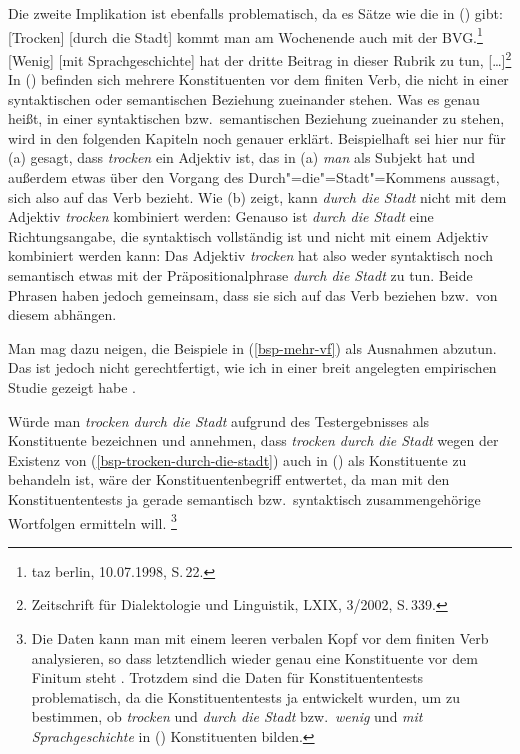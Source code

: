\documentclass[ number=45
			   ,series=eotms
			   ,printondemand
			  ]{langsci}
\newcommand{\NOTE}[1]{}
\begin{document}
{Die zweite Implikation ist ebenfalls problematisch, da es Sätze
wie die in () gibt:
\eal
\label{bsp-mehr-vf}
\ex\label{bsp-trocken-durch-die-stadt}
{}[Trocken] [durch die Stadt] kommt man am Wochenende auch mit der BVG.\footnote{
        taz berlin, 10.07.1998, S.\,22.
      }
\ex {}[Wenig] [mit Sprachgeschichte] hat der dritte Beitrag in dieser Rubrik zu tun, [\ldots]\footnote{
  Zeitschrift für Dialektologie und Linguistik, LXIX, 3/2002, S.\,339.
}
\zl
In () befinden sich mehrere Konstituenten vor dem finiten Verb, die nicht in einer syntaktischen
oder semantischen
Beziehung zueinander stehen. Was es genau heißt,
in einer syntaktischen bzw.\ semantischen Beziehung zueinander zu stehen, wird in den folgenden
Kapiteln noch genauer erklärt. Beispielhaft sei hier nur
für (a) gesagt, dass \emph{trocken} ein Adjektiv ist, das in (a) \emph{man}
als Subjekt hat und außerdem etwas über den Vorgang des Durch"=die"=Stadt"=Kommens aussagt,
sich also auf das Verb bezieht. Wie (b) zeigt, kann \emph{durch die Stadt} nicht
mit dem Adjektiv \emph{trocken} kombiniert werden:
\eal
{}
\zl
Genauso ist \emph{durch die Stadt} eine Richtungsangabe, die syntaktisch vollständig ist
und nicht mit einem Adjektiv kombiniert werden kann:
\eal
{}
\zl
Das Adjektiv \emph{trocken} hat also weder syntaktisch noch semantisch etwas mit 
der Präpositionalphrase \emph{durch die Stadt} zu tun. Beide Phrasen haben jedoch gemeinsam,
dass sie sich auf das Verb beziehen bzw.\ von diesem abhängen.

Man mag dazu neigen, die Beispiele in (\ref{bsp-mehr-vf}) als Ausnahmen
abzutun. Das ist jedoch nicht gerechtfertigt, wie ich in einer breit angelegten empirischen
Studie gezeigt habe \citep{Mueller2003b}.

Würde man \emph{trocken durch die Stadt} aufgrund des Testergebnisses als Konstituente bezeichnen
und annehmen, dass \emph{trocken durch die Stadt} wegen der Existenz von (\ref{bsp-trocken-durch-die-stadt})
auch in () als Konstituente zu behandeln ist, 
wäre der Konstituentenbegriff entwertet, da man mit den Konstituententests ja gerade semantisch
bzw.\ syntaktisch zusammengehörige Wortfolgen ermitteln will.%
\footnote{
  Die Daten kann man mit einem leeren verbalen Kopf vor dem finiten Verb analysieren,
  so dass letztendlich wieder genau eine Konstituente vor dem Finitum steht \citep{Mueller2005d}.
  Trotzdem sind die Daten für Konstituententests problematisch, da die Konstituententests
  ja entwickelt wurden, um zu bestimmen, ob \zb \emph{trocken} und \emph{durch die Stadt}
  bzw.\ \emph{wenig} und \emph{mit Sprachgeschichte} in () Konstituenten bilden.%
}

}
\end{document}
